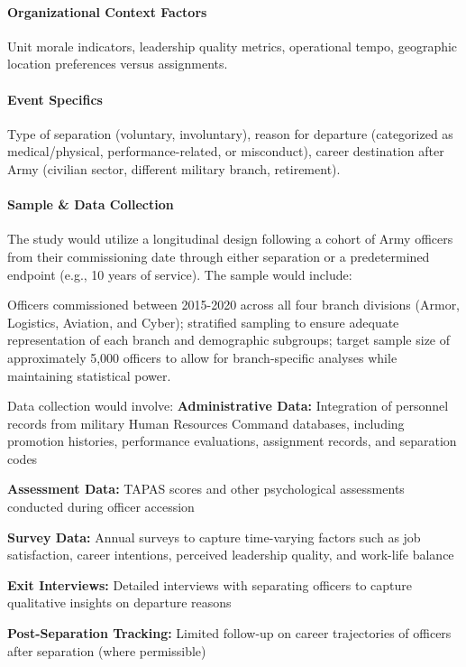 \documentclass[../main.tex]{subfiles}
\begin{document}
\paragraph{Organizational Context Factors}
Unit morale indicators, leadership quality metrics, operational tempo, geographic location preferences versus assignments.

\paragraph{Event Specifics}
Type of separation (voluntary, involuntary), reason for departure (categorized as medical/physical, performance-related, or misconduct), career destination after Army (civilian sector, different military branch, retirement).

\paragraph{Sample \& Data Collection}

The study would utilize a longitudinal design following a cohort of Army officers from their commissioning date through either separation or a predetermined endpoint (e.g., 10 years of service). The sample would include:

Officers commissioned between 2015-2020 across all four branch divisions (Armor, Logistics, Aviation, and Cyber); stratified sampling to ensure adequate representation of each branch and demographic subgroups; target sample size of approximately 5,000 officers to allow for branch-specific analyses while maintaining statistical power.

Data collection would involve:
\textbf{Administrative Data:} Integration of personnel records from military Human Resources Command databases, including promotion histories, performance evaluations, assignment records, and separation codes

\textbf{Assessment Data:} TAPAS scores and other psychological assessments conducted during officer accession

\textbf{Survey Data:} Annual surveys to capture time-varying factors such as job satisfaction, career intentions, perceived leadership quality, and work-life balance

\textbf{Exit Interviews:} Detailed interviews with separating officers to capture qualitative insights on departure reasons

\textbf{Post-Separation Tracking:} Limited follow-up on career trajectories of officers after separation (where permissible)
\end{document}
